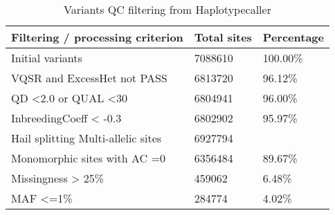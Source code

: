 \begin{table}[!ht]
\centering
\caption{Variants QC filtering from Haplotypecaller}
~\\
\label{tab:Mutation_filter_step}
\begin{tabular}{lll}
\toprule
\textbf{Filtering / processing criterion}		  & \textbf{Total sites}   &\textbf{Percentage}                                                                                                                                       \\ \toprule
Initial variants                   & 7088610	&100.00\%	\\
\midrule
VQSR and ExcessHet not PASS & 6813720 	&96.12\%	\\
\midrule
QD <2.0 or QUAL <30 & 6804941	&96.00\%	\\
\midrule
InbreedingCoeff < -0.3  & 6802902	&95.97\%	\\
\midrule
Hail splitting Multi-allelic sites 	& 6927794 	&\\
\midrule
Monomorphic sites with AC =0 & 6356484	&89.67\% \\
\midrule
Missingness > 25\% & 459062	&6.48\% \\
\midrule
MAF <=1\% & 284774	& 4.02\% \\ 
\bottomrule
\end{tabular}
\end{table}
